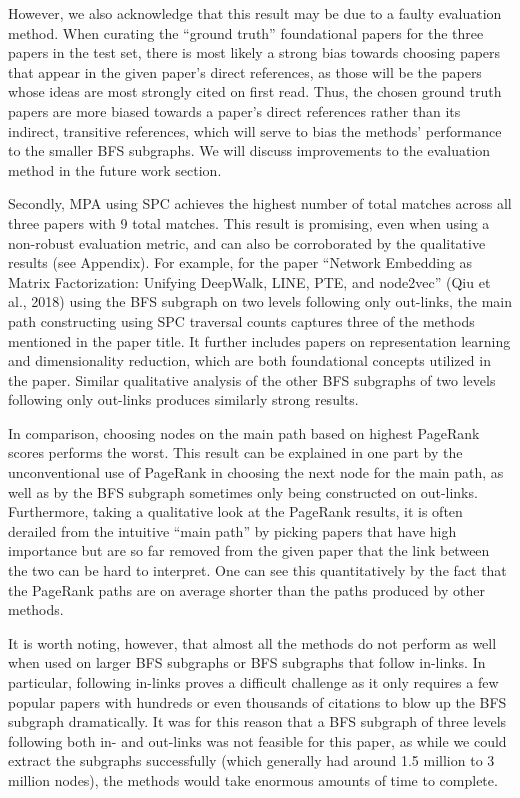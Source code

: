 \documentclass[lettepaper,]{article}
\begin{document}
However, we also acknowledge that this result may be due to a faulty
evaluation method. When curating the ``ground truth'' foundational
papers for the three papers in the test set, there is most likely a
strong bias towards choosing papers that appear in the given paper's
direct references, as those will be the papers whose ideas are most
strongly cited on first read. Thus, the chosen ground truth papers are
more biased towards a paper's direct references rather than its
indirect, transitive references, which will serve to bias the methods'
performance to the smaller BFS subgraphs. We will discuss improvements
to the evaluation method in the future work section.

Secondly, MPA using SPC achieves the highest number of total matches
across all three papers with 9 total matches. This result is promising,
even when using a non-robust evaluation metric, and can also be
corroborated by the qualitative results (see Appendix). For example, for
the paper ``Network Embedding as Matrix Factorization: Unifying
DeepWalk, LINE, PTE, and node2vec'' (Qiu et al., 2018) using the BFS
subgraph on two levels following only out-links, the main path
constructing using SPC traversal counts captures three of the methods
mentioned in the paper title. It further includes papers on
representation learning and dimensionality reduction, which are both
foundational concepts utilized in the paper. Similar qualitative
analysis of the other BFS subgraphs of two levels following only
out-links produces similarly strong results.

In comparison, choosing nodes on the main path based on highest PageRank
scores performs the worst. This result can be explained in one part by
the unconventional use of PageRank in choosing the next node for the
main path, as well as by the BFS subgraph sometimes only being
constructed on out-links. Furthermore, taking a qualitative look at the
PageRank results, it is often derailed from the intuitive ``main path''
by picking papers that have high importance but are so far removed from
the given paper that the link between the two can be hard to interpret.
One can see this quantitatively by the fact that the PageRank paths are
on average shorter than the paths produced by other methods.

It is worth noting, however, that almost all the methods do not perform
as well when used on larger BFS subgraphs or BFS subgraphs that follow
in-links. In particular, following in-links proves a difficult challenge
as it only requires a few popular papers with hundreds or even thousands
of citations to blow up the BFS subgraph dramatically. It was for this
reason that a BFS subgraph of three levels following both in- and
out-links was not feasible for this paper, as while we could extract the
subgraphs successfully (which generally had around 1.5 million to 3
million nodes), the methods would take enormous amounts of time to
complete.
\end{document}

